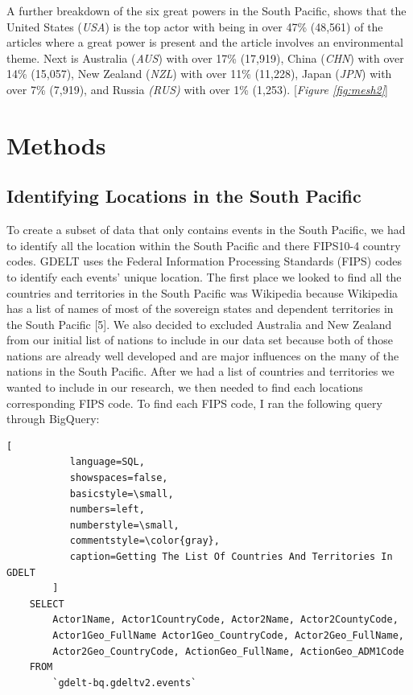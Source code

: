 \documentclass[12pt]{article}
\begin{document}
A further breakdown of the six great powers in the South Pacific, shows that the United States (\textit{USA}) is the top actor with being in over 47\% (48,561) of the articles where a great power is present and the article involves an environmental theme. Next is Australia (\textit{AUS}) with over 17\% (17,919), China (\textit{CHN}) with over 14\% (15,057), New Zealand (\textit{NZL}) with over 11\% (11,228), Japan (\textit{JPN}) with over 7\% (7,919), and Russia \textit{(RUS)} with over 1\% (1,253). [\textit{Figure \ref{fig:mesh2}}]

\section*{Methods}

\subsection*{Identifying Locations in the South Pacific}
To create a subset of data that only contains events in the South Pacific, we had to identify all the location within the South Pacific and there FIPS10-4 country codes. GDELT uses the Federal Information Processing Standards (FIPS) codes to identify each events’ unique location. 
The first place we looked to find all the countries and territories in the South Pacific was Wikipedia because Wikipedia has a list of names of most of the sovereign states and dependent territories in the South Pacific [5]. We also decided to excluded Australia and New Zealand from our initial list of nations to include in our data set because both of those nations are already well developed and are major influences on the many of the nations in the South Pacific. 
After we had a list of countries and territories we wanted to include in our research, we then needed to find each locations corresponding FIPS code. To find each FIPS code, I ran the following query through BigQuery:
\begin{lstlisting}[
           language=SQL,
           showspaces=false,
           basicstyle=\small,
           numbers=left,
           numberstyle=\small,
           commentstyle=\color{gray},
           caption=Getting The List Of Countries And Territories In GDELT
        ]
    SELECT
        Actor1Name, Actor1CountryCode, Actor2Name, Actor2CountyCode, 
        Actor1Geo_FullName Actor1Geo_CountryCode, Actor2Geo_FullName, 
        Actor2Geo_CountryCode, ActionGeo_FullName, ActionGeo_ADM1Code 
    FROM 
        `gdelt-bq.gdeltv2.events` 
\end{lstlisting}
\end{document}
